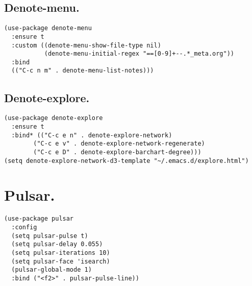\documentclass[11pt]{article}
\begin{document}
\subsection{Denote-menu.}
\label{sec:org311941d}
\begin{verbatim}
(use-package denote-menu
  :ensure t
  :custom ((denote-menu-show-file-type nil)
           (denote-menu-initial-regex "==[0-9]+--.*_meta.org"))
  :bind 
  (("C-c n m" . denote-menu-list-notes)))
\end{verbatim}
\subsection{Denote-explore.}
\label{sec:org41ecb1a}
\begin{verbatim}
(use-package denote-explore
  :ensure t
  :bind* (("C-c e n" . denote-explore-network)
        ("C-c e v" . denote-explore-network-regenerate)
        ("C-c e D" . denote-explore-barchart-degree)))
(setq denote-explore-network-d3-template "~/.emacs.d/explore.html")
\end{verbatim}
\section{Pulsar.}
\label{sec:org54427ed}
\begin{verbatim}
(use-package pulsar
  :config
  (setq pulsar-pulse t)
  (setq pulsar-delay 0.055)
  (setq pulsar-iterations 10)
  (setq pulsar-face 'isearch)
  (pulsar-global-mode 1)
  :bind ("<f2>" . pulsar-pulse-line))
\end{verbatim}
\end{document}
